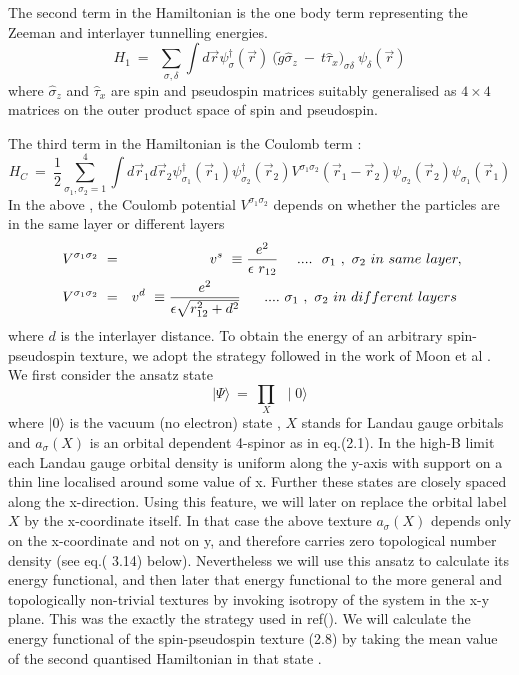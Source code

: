 The second term in the Hamiltonian is the one
body term representing the Zeeman and interlayer tunnelling energies.
\begin{equation} H_{1} \ = \  \ \sum_{\sigma,\delta } \int d\vec{r}
\psi^{\dag}_{\sigma}(\vec{r}) \ \big( \tilde{g} \hat{\sigma}_{z} \ - \ t
\hat{\tau}_{x} \big)
_{\sigma \delta} \ \psi_{\delta}(\vec{r}) \end{equation}
where $\hat{\sigma}_{z}$ and $\hat{\tau}_{x}$ are spin and pseudospin
matrices suitably generalised as $4 \times 4$ matrices on the outer
product space of spin and pseudospin.

The third term in the Hamiltonian is the Coulomb term :
\begin{equation} H_{C} \ = \ \frac{1}{2} \sum_{\sigma_{1},\sigma_{2} =1}^{4}
\int d \vec{r}_{1}
d \vec{r}_{2}\psi^{\dag}_{\sigma_{1}}(\vec{r}_{1})\psi^{\dag}_{\sigma_{2}}
(\vec{r}_{2})V^{\sigma_{1} \sigma_{2}}
(\vec{r}_{1} -\vec{r}_{2})\psi_{\sigma_{2}}(\vec{r}_{2})\psi_{\sigma_{1}}(\vec{r}_{1}) \label{Hint} \end{equation} 
In the above , the
Coulomb potential $ V^{\sigma_{1} \sigma_{2}}$ depends on
whether the particles
are in the same layer or different layers
\begin{eqnarray} V^{\sigma_{1} \sigma_{2}} \ &=& v^{s} \ \equiv
{ e^2 \over \epsilon \ r_{12}} \ \ \ \  
.... \ \ {\sigma_{1} \ , \  \sigma_{2} } \ in \ same \ layer, \nonumber \\
\ V^{ \sigma_{1} \sigma_{2}} \ &=& v^{d} \ \equiv
{ e^2 \over \epsilon \sqrt{r_{12}^{2} + d^{2}}} \ \ \ \  
\ .... \  {\sigma_{1} \ , \  \sigma_{2}} \ in \ different \ layers \ \end{eqnarray}
where $d$ is the interlayer distance.
To obtain the energy of an arbitrary spin-pseudospin texture, we adopt the
strategy followed in the work of Moon et al \cite{Moon}. We first consider the
ansatz state
\begin{equation} \mid \Psi \rangle \ = \ \prod_{X} \  \ \mid 0 \rangle \label{state} \end{equation}
where $\mid 0 \rangle$ is the vacuum (no electron) state , $X$ stands
for Landau gauge orbitals and $a_{\sigma}(X)$ is an orbital
dependent 4-spinor as in eq.(2.1). In the high-B limit each
Landau gauge orbital density is uniform along the y-axis with
support on a thin line localised around some value of x.
Further these states are closely spaced along the x-direction.
Using this feature, we will later on replace the orbital label $X$ by
the x-coordinate itself. In that case the above texture $a_{\sigma}(X)$
depends only on the x-coordinate and not on y, and therefore carries
zero topological number density (see eq.( 3.14) below).
Nevertheless we will use this ansatz to calculate its energy functional,
and then later that energy functional to the more general and
topologically non-trivial textures by invoking isotropy of the system in the
x-y plane. This was the exactly the strategy used in ref(\cite{Moon}).
We will calculate the energy functional of the spin-pseudospin texture (2.8)
by taking the mean value of the second quantised Hamiltonian in
that state .

